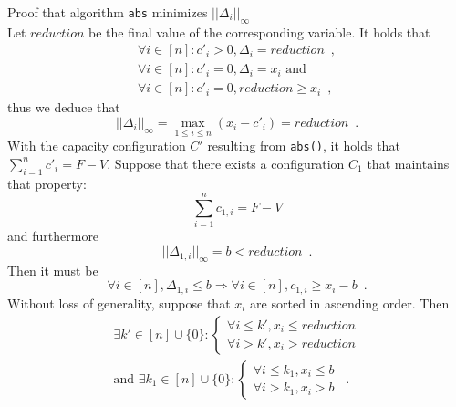 \begin{sepproof}{Proof that algorithm \texttt{abs} minimizes $||\Delta_i||_{\infty}$} \ \\
  Let $reduction$ be the final value of the corresponding variable. It holds that
  \begin{equation*}
  \begin{gathered}
    \forall i \in [n] : c'_i > 0, \Delta_i = reduction \enspace, \\
    \forall i \in [n] : c'_i = 0, \Delta_i = x_i \mbox{ and} \\
    \forall i \in [n] : c'_i = 0, reduction \geq x_i \enspace,
  \end{gathered}
  \end{equation*}
  thus we deduce that
  \begin{equation*}
    ||\Delta_i||_{\infty} = \max\limits_{1 \leq i \leq n}{\left(x_i - c'_i\right)} = reduction \enspace.
  \end{equation*}
  With the capacity configuration $C'$ resulting from \texttt{abs()}, it holds that $\sum\limits_{i=1}^nc'_i = F - V$.
  Suppose that there exists a configuration $C_1$ that maintains that property:
  \begin{equation}
  \label{abs:c1valid}
    \sum\limits_{i=1}^nc_{1, i} = F - V
  \end{equation}
  and furthermore
  \begin{equation}
  \label{abs:b}
    ||\Delta_{1, i}||_\infty = b < reduction \enspace.
  \end{equation}
  Then it must be
  \begin{equation*}
    \forall i \in [n], \Delta_{1, i} \leq b \Rightarrow \forall i \in [n], c_{1, i} \geq x_i - b \enspace.
  \end{equation*}
  Without loss of generality, suppose that $x_i$ are sorted in ascending order. Then
  \begin{equation*}
  \begin{gathered}
    \exists k' \in [n] \cup \{0\} :
    \begin{cases}
      \forall i \leq k', x_i \leq reduction \\
      \forall i > k', x_i > reduction
    \end{cases} \\
    \mbox{and } \exists k_1 \in [n] \cup \{0\} :
    \begin{cases}
      \forall i \leq k_1, x_i \leq b \\
      \forall i > k_1, x_i > b
    \end{cases} \enspace.

\end{gathered}
\end{equation*}
\end{sepproof}
